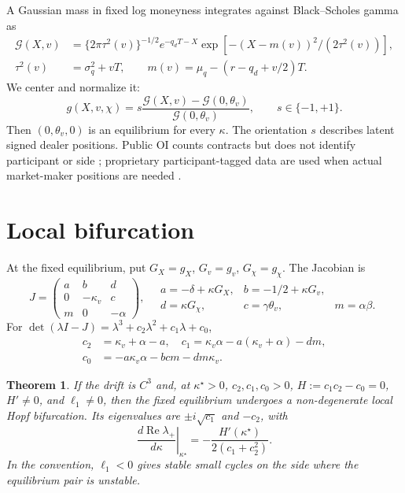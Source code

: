 \documentclass{article}
\newtheorem{theorem}{Theorem}
\begin{document}
A Gaussian mass in fixed log moneyness integrates against Black--Scholes gamma
as
\begin{align}
\mathcal G(X,v)&=\{2\pi\tau^2(v)\}^{-1/2}e^{-q_dT-X}
\exp[-(X-m(v))^2/(2\tau^2(v))],\nonumber\\
\tau^2(v)&=\sigma_q^2+vT,\qquad
m(v)=\mu_q-(r-q_d+v/2)T.\label{eq:book}
\end{align}
We center and normalize it:
\begin{equation}
g(X,v,\chi)=s\frac{\mathcal G(X,v)-\mathcal G(0,\theta_v)}
{\mathcal G(0,\theta_v)},\qquad s\in\{-1,+1\}.\label{eq:center}
\end{equation}
Then $(0,\theta_v,0)$ is an equilibrium for every $\kappa$. The orientation
$s$ describes latent signed dealer positions. Public OI counts contracts but
does not identify participant or side \citep{oicopeninterest}; proprietary
participant-tagged data are used when actual market-maker positions are needed
\citep{vasquez2025zerodte}.

\section{Local bifurcation}

At the fixed equilibrium, put $G_X=g_X$, $G_v=g_v$, $G_\chi=g_\chi$. The
Jacobian is
\begin{equation}
J=\begin{pmatrix}a&b&d\\0&-\kappa_v&c\\m&0&-\alpha\end{pmatrix},
\quad
\begin{matrix}a=-\delta+\kappa G_X,&b=-1/2+\kappa G_v,\\
d=\kappa G_\chi,&c=\gamma\theta_v,&m=\alpha\beta.
\end{matrix}\label{eq:J}
\end{equation}
For $\det(\lambda I-J)=\lambda^3+c_2\lambda^2+c_1\lambda+c_0$,
\begin{align*}
c_2&=\kappa_v+\alpha-a,\quad
c_1=\kappa_v\alpha-a(\kappa_v+\alpha)-dm,\\
c_0&=-a\kappa_v\alpha-bcm-dm\kappa_v.
\end{align*}

\begin{theorem}
If the drift is $C^3$ and, at $\kappa^\star>0$,
$c_2,c_1,c_0>0$, $H:=c_1c_2-c_0=0$, $H'\ne0$, and
$\ell_1\ne0$, then the fixed equilibrium undergoes a non-degenerate local
Hopf bifurcation. Its eigenvalues are $\pm i\sqrt{c_1}$ and $-c_2$, with
\[
\left.\frac{d\operatorname{Re}\lambda_+}{d\kappa}\right|_{\kappa^\star}
=-\frac{H'(\kappa^\star)}{2(c_1+c_2^2)}.
\]
In the \citet{kuznetsov2004} convention, $\ell_1<0$ gives stable small cycles
on the side where the equilibrium pair is unstable.
\end{theorem}
\end{document}
